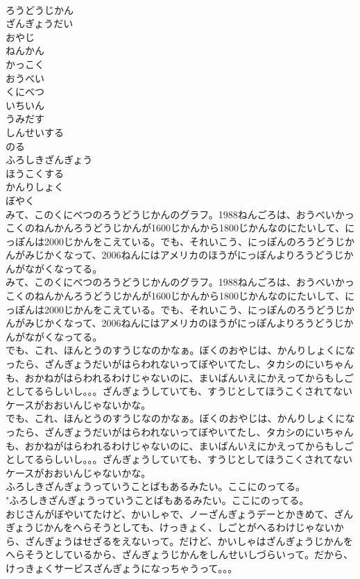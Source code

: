 \documentclass[8pt]{extreport}
\begin{document}
\begin{CJK}{UTF8}{min}
\\	ろうどうじかん
\\	ざんぎょうだい
\\	おやじ
\\	ねんかん
\\	かっこく
\\	おうべい
\\	くにべつ
\\	いちいん
\\	うみだす
\\	しんせいする
\\	のる
\\	ふろしきざんぎょう
\\	ほうこくする
\\	かんりしょく
\\	ぼやく
\\	みて、このくにべつのろうどうじかんのグラフ。1988ねんごろは、おうべいかっこくのねんかんろうどうじかんが1600じかんから1800じかんなのにたいして、にっぽんは2000じかんをこえている。でも、それいこう、にっぽんのろうどうじかんがみじかくなって、2006ねんにはアメリカのほうがにっぽんよりろうどうじかんがながくなってる。	
\\	みて、このくにべつのろうどうじかんのグラフ。1988ねんごろは、おうべいかっこくのねんかんろうどうじかんが1600じかんから1800じかんなのにたいして、にっぽんは2000じかんをこえている。でも、それいこう、にっぽんのろうどうじかんがみじかくなって、2006ねんにはアメリカのほうがにっぽんよりろうどうじかんがながくなってる。 
\\	でも、これ、ほんとうのすうじなのかなぁ。ぼくのおやじは、かんりしょくになったら、ざんぎょうだいがはらわれないってぼやいてたし、タカシのにいちゃんも、おかねがはらわれるわけじゃないのに、まいばんいえにかえってからもしごとしてるらしいし。。。ざんぎょうしていても、すうじとしてほうこくされてないケースがおおいんじゃないかな。	
\\	でも、これ、ほんとうのすうじなのかなぁ。ぼくのおやじは、かんりしょくになったら、ざんぎょうだいがはらわれないってぼやいてたし、タカシのにいちゃんも、おかねがはらわれるわけじゃないのに、まいばんいえにかえってからもしごとしてるらしいし。。。ざんぎょうしていても、すうじとしてほうこくされてないケースがおおいんじゃないかな。 
\\	ふろしきざんぎょうっていうことばもあるみたい。ここにのってる。	
\\	"ふろしきざんぎょうっていうことばもあるみたい。ここにのってる。 
\\	おじさんがぼやいてたけど、かいしゃで、ノーざんぎょうデーとかきめて、ざんぎょうじかんをへらそうとしても、けっきょく、しごとがへるわけじゃないから、ざんぎょうはせざるをえないって。だけど、かいしゃはざんぎょうじかんをへらそうとしているから、ざんぎょうじかんをしんせいしづらいって。だから、けっきょくサービスざんぎょうになっちゃうって。。。	

\end{CJK}
\end{document}
